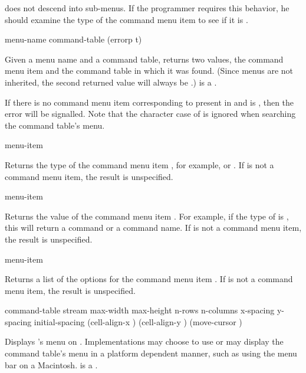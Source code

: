  does not descend into sub-menus.  If the
programmer requires this behavior, he should examine the type of the command
menu item to see if it is .


 {menu-name command-table \key (errorp t)}

Given a menu name and a command table, returns two values, the command menu item
and the command table in which it was found.  (Since menus are not inherited,
the second returned value will always be .)
 is a .
\ReadOnly

If there is no command menu item corresponding to  present in
 and  is , then the
 error will be signalled.  Note that the character
case of  is ignored when searching the command table's menu.


 {menu-item}

Returns the type of the command menu item , for example,
 or .  If  is not a command menu item, the
result is unspecified.

 {menu-item}

Returns the value of the command menu item .  For example, if the
type of  is , this will return a command or a
command name.  If  is not a command menu item, the result is
unspecified.

 {menu-item}

Returns a list of the options for the command menu item .  If
 is not a command menu item, the result is unspecified.


 {command-table stream
                                          \key max-width max-height n-rows n-columns
                                               x-spacing y-spacing initial-spacing
                                               (cell-align-x ) (cell-align-y )
                                               (move-cursor )}

Displays 's menu on .  Implementations may choose
to use  or may display the command table's menu in a
platform dependent manner, such as using the menu bar on a Macintosh.
 is a .

